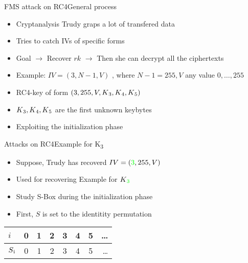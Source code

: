 \documentclass[
	aspectratio=169,	%
	onlytextwidth,		%
	t					%
	]{beamer}
\begin{document}
\begin{frame}[fragile]{FMS attack on RC4}{General process}
	\begin{itemize}
		\item Cryptanalysis Trudy graps a lot of transfered data
		\item Tries to catch IVs of specific forms 
		\item Goal $\rightarrow$ Recover $rk$ $\rightarrow$ Then she can decrypt all the ciphertexts
		\item Example: $ IV = (3, N-1, V)$ , where $N-1 = 255, V$ any value ${0,\dots,255}$
		\item RC4-key of form $(3, 255, V, K\textsubscript{3}, K\textsubscript{4},K\textsubscript{5})$
		\item $K\textsubscript{3}, K\textsubscript{4},K\textsubscript{5}$ are the first unknown keybytes
		\item Exploiting the initialization phase
	\end{itemize}
\end{frame}

\begin{frame}[fragile]{Attacks on RC4}{Example for K\textsubscript{3}}
	\begin{itemize}
		\item Suppose, Trudy has recoverd $IV = (\textcolor{green}{3}, 255, V)$ 
		\item Used for recovering Example for $K\textsubscript{\textcolor{green}{3}}$
		\item Study S-Box during the initialization phase
		\item First, $S$ is set to the identitity permutation
	\end{itemize}
	\medskip
	\begin{table}[h!]
		\begin{center}
		  \begin{tabular}{l|c|c|c|c|c|c|r}
			$i$ & 0 & 1 & 2 & 3 & 4 & 5 & \dots\\
			\hline
			$S\textsubscript{i}$ & 0 & 1 & 2 & 3 & 4 & 5 & \dots\\
		  \end{tabular}
		\end{center}
	\end{table}
\end{frame}
\end{document}
